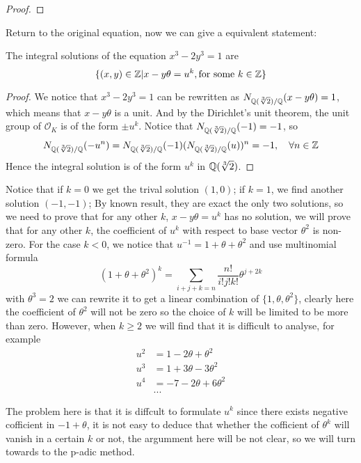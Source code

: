 \begin{proposition}
\begin{proof}
    \end{proof}
\end{proposition}

Return to the original equation, now we can give a equivalent statement:
\begin{proposition} \label{equi}
    The integral solutions of the equation \(x^3-2y^3=1\) are
    \[\{(x,y)\in \mathbb{Z}| x-y\theta = u^k, \text{for some } k \in \mathbb{Z}\}\]

    \begin{proof}
        We notice that \(x^3-2y^3 = 1 \) can be rewritten as \(N_{\mathbb{Q}(\sqrt[3]{2}) / \mathbb{Q}}(x-y\theta) = 1\), which means that \(x-y\theta\) is a unit. And by the Dirichlet's unit theorem, the unit group of \(\mathcal{O}_K\) is of the form \(\pm u^k\). Notice that \(N_{\mathbb{Q}(\sqrt[3]{2}) / \mathbb{Q}}(-1) = -1\), so
        \[N_{\mathbb{Q}(\sqrt[3]{2}) / \mathbb{Q}}(-u^n) = N_{\mathbb{Q}(\sqrt[3]{2}) / \mathbb{Q}}(-1)(N_{\mathbb{Q}(\sqrt[3]{2}) / \mathbb{Q}}(u))^n = -1, \quad \forall n \in \mathbb{Z} \]
        Hence the integral solution is of the form \(u^k\) in \(\mathbb{Q}(\sqrt[3]{2})\).
    \end{proof}
\end{proposition}

Notice that if \(k=0\) we get the trival solution \((1,0)\); if \(k=1\), we find another solution \((-1,-1)\); By known result, they are exact the only two solutions, so we need to prove that for any other \(k\), \(x-y\theta = u^k\) has no solution, we will prove that for any other \(k\), the coefficient of \(u^k\) with respect to base vector \(\theta^2\) is non-zero. For the case \(k<0\), we notice that \(u^{-1} = 1+\theta +\theta^2\) and use multinomial formula
\[(1+\theta+ \theta^2)^k = \sum_{i+j+k=n} \frac{n!}{i!j!k!}\theta ^{j+2k}\]
with \(\theta ^3= 2\) we can rewrite it to get a linear combination of \(\{1,\theta,\theta ^2\}\), clearly here the coefficient of \(\theta ^2\) will not be zero so the choice of \(k\) will be limited to be more than zero. However, when \(k \geq  2\) we will find that it is difficult to analyse, for example
\begin{align*}
    u^2 &= 1- 2\theta +\theta^2 \\
    u^3 &= 1+3\theta-3\theta^2 \\
    u^4 &= -7-2\theta+6\theta^2\\
    &...
\end{align*}
 
The problem here is that it is diffcult to formulate \(u^{k}\) since there exists negative cofficient in \(-1+\theta\), it is not easy to deduce that whether the cofficient of \(\theta^k\) will vanish in a certain \(k\) or not, the argumment here will be not clear, so we will turn towards to the p-adic method.
\newline 


